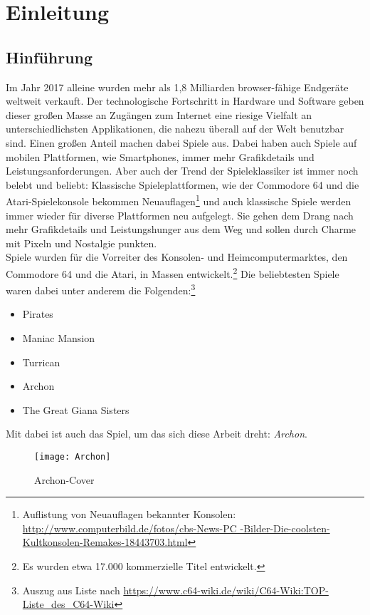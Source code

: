 \chapter{Einleitung}
\label{cha:Einleitung}

\section{Hinführung}
\label{sec:hinfuhrung}
Im Jahr 2017 alleine wurden mehr als 1,8 Milliarden browser-fähige Endgeräte weltweit verkauft.\cite{statista_absatz} Der technologische Fortschritt in Hardware und Software geben dieser großen Masse an Zugängen zum Internet eine riesige Vielfalt an unterschiedlichsten Applikationen, die nahezu überall auf der Welt benutzbar sind. Einen großen Anteil machen dabei Spiele aus. Dabei haben auch Spiele auf mobilen Plattformen, wie Smartphones, immer mehr Grafikdetails und Leistungsanforderungen. Aber auch der Trend der Spieleklassiker ist immer noch belebt und beliebt: Klassische Spieleplattformen, wie der Commodore 64 und die Atari-Spielekonsole bekommen Neuauflagen\footnote{Auflistung von Neuauflagen bekannter Konsolen:\\ \url{http://www.computerbild.de/fotos/cbs-News-PC
-Bilder-Die-coolsten-Kultkonsolen-Remakes-18443703.html}} und auch klassische Spiele werden immer wieder für diverse Plattformen neu aufgelegt. Sie gehen dem Drang nach mehr Grafikdetails und Leistungshunger aus dem Weg und sollen durch Charme mit Pixeln und Nostalgie punkten.\\
Spiele wurden für die Vorreiter des Konsolen- und Heimcomputermarktes, den Commodore 64 und die Atari, in Massen entwickelt.\footnote{Es wurden etwa 17.000 kommerzielle Titel entwickelt.\cite{commodore64}}
Die beliebtesten Spiele waren dabei unter anderem die Folgenden:\footnote{Auszug aus Liste nach \url{https://www.c64-wiki.de/wiki/C64-Wiki:TOP-Liste_des_C64-Wiki}}
\begin{itemize}
	\item Pirates
	\item Maniac Mansion
	\item Turrican 
	\item Archon
	\item The Great Giana Sisters
\end{itemize}
Mit dabei ist auch das Spiel, um das sich diese Arbeit dreht: \emph{Archon}.
\begin{figure}[htp]
\centering
\captionsetup{justification=centering}
\texttt{[image: Archon]}
\caption[Archon - Cover]{Archon-Cover\footnotemark}
\label{fig:Archon_Cover}
\end{figure}
